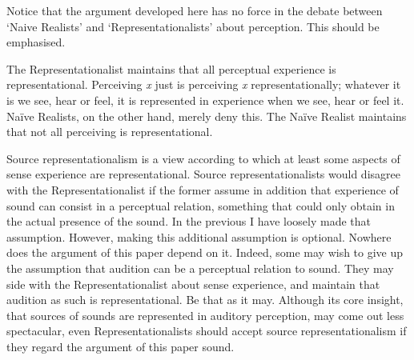 \documentclass[sloppy, journal, git, bytitle, dodraft]{humapap}
\begin{document}
Notice that the argument developed here has no force in the debate between `Naive Realists' and `Representationalists' about perception. This should be emphasised. 

The Representationalist maintains that all perceptual experience is representational. Perceiving \emph{x} just is perceiving \emph{x} representationally; whatever it is we see, hear or feel, it is represented in experience when we see, hear or feel it. Naïve Realists, on the other hand, merely deny this. The Naïve Realist maintains that not all perceiving is representational.

Source representationalism is a view according to which at least some aspects of sense experience are representational. Source representationalists would disagree with the Representationalist if the former assume in addition that experience of sound can consist in a perceptual relation, something that could only obtain in the actual presence of the sound. In the previous I have loosely made that assumption. However, making this additional assumption is optional. Nowhere does the argument of this paper depend on it. Indeed, some may wish to give up the assumption that audition can be a perceptual relation to sound. They may side with the Representationalist about sense experience, and maintain that audition as such is representational. Be that as it may. Although its core insight, that sources of sounds are represented in auditory perception, may come out less spectacular, even Representationalists should accept source representationalism if they regard the argument of this paper sound. 





% 
% 
% 


\printbibliography
\end{document}
